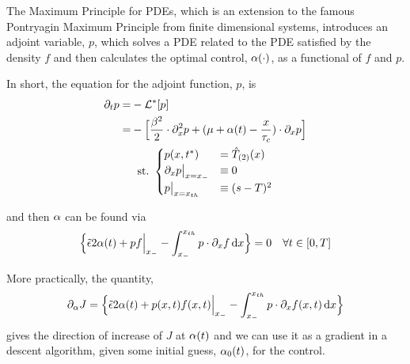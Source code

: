 \documentclass[12pt]{iopart}
\begin{document}
The Maximum Principle for PDEs, which is an extension to the famous Pontryagin
Maximum Principle from finite dimensional systems, introduces an adjoint
variable, $p$, which solves a PDE related to the PDE satisfied by the density
$f$ and then calculates the optimal control, ${\alpha}(\cdot)$, as a functional of $f$
and $p$.

In short, the equation for the adjoint function, $p$, is
\begin{equation}
\begin{gathered}
\begin{aligned}
{\partial}_t p =& - { { \mathcal{L} }^* }[p]
\\
		=&
			- \Big[ \frac{{\beta}^2 }{2}\cdot {\partial}^2_x p +
			({\mu } + {\alpha}(t)- \frac{x}{{ \tau_{c} }})  \cdot {\partial}_x p \Big]
\end{aligned}
\\
{ \textrm{st.\ } }
\begin{cases}
	p(x,{ t^* }) &= { \hat{T}_{(2)} }(x)
	\\
	{\partial}_x p  \big|_{x={ x_{-} }} &\equiv 0
	\\
	p \big|_{x={ x_{th} }} &\equiv (s-T)^2
\end{cases}
\label{eq:adjoint_pde_OU}
\end{gathered}
\end{equation}

and then ${\alpha}$ can be found via
\begin{equation}
\Big\{
 \tilde{{\epsilon}}  2 {\alpha}(t)
+ p f \Big|_{ x_{-} }
- \int _{ x_{-} }^{ x_{th} } p \cdot {\partial}_x f \, \mathrm{d} x
\Big\} = 0
\quad \forall t \in [0,T]
\label{eq:J_necessary_condition}
\end{equation}

More practically, the quantity,
$${\partial}_{\alpha} J =  \Big\{
 \tilde{{\epsilon}}  2 {\alpha}(t)
+ p(x,t) f(x,t) \Big|_{ x_{-} }
- \int _{ x_{-} }^{ x_{th} } p \cdot {\partial}_x f(x,t) \, \mathrm{d} x
\Big\}
$$
gives the direction of increase of $J$ at ${\alpha}(t)$
and we can use it as a gradient in a descent algorithm, given some initial
guess, ${\alpha}_0(t)$, for the control.
\end{document}

